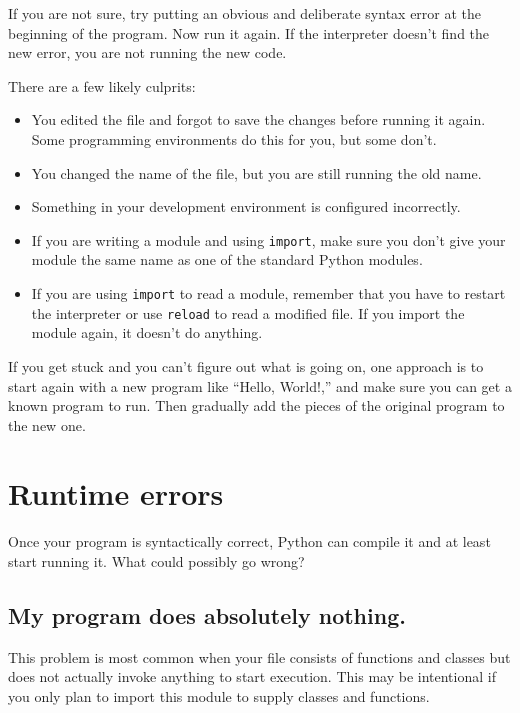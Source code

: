 \documentclass[10pt]{book}
\begin{document}
If you are not sure, try putting an obvious and deliberate syntax
error at the beginning of the program.  Now run it again.  If the
interpreter doesn't find the new error, you are not running the
new code.

There are a few likely culprits:

\begin{itemize}

\item You edited the file and forgot to save the changes before
running it again.  Some programming environments do this
for you, but some don't.

\item You changed the name of the file, but you are still running
the old name.

\item Something in your development environment is configured
incorrectly.

\item If you are writing a module and using {\tt import},
make sure you don't give your module the same name as one
of the standard Python modules.

\item If you are using {\tt import} to read a module, remember
that you have to restart the interpreter or use {\tt reload}
to read a modified file.  If you import the module again, it
doesn't do anything.

\end{itemize}

If you get stuck and you can't figure out what is going on, one
approach is to start again with a new program like ``Hello, World!,''
and make sure you can get a known program to run.  Then gradually add
the pieces of the original program to the new one.


\section{Runtime errors}

Once your program is syntactically correct,
Python can compile it and at least start running it.  What could
possibly go wrong?


\subsection{My program does absolutely nothing.}

This problem is most common when your file consists of functions and
classes but does not actually invoke anything to start execution.
This may be intentional if you only plan to import this module to
supply classes and functions.
\end{document}
